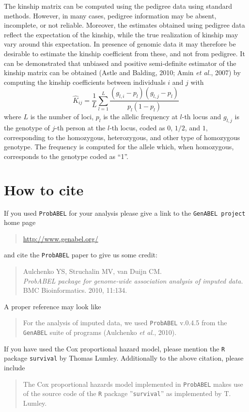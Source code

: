 \documentclass[12pt,a4paper]{article}
\newcommand{\PA}{\texttt{ProbABEL}}
\begin{document}
The kinship matrix can be computed using the pedigree data using standard methods.
However, in many cases, pedigree information may be absent, incomplete, or not
reliable. Moreover, the estimates obtained using pedigree data reflect the
expectation of the kinship, while the true realization of kinship may vary
around this expectation. In presence of genomic data it may therefore be
desirable to estimate the kinship coefficient from these, and not from pedigree.
It can be demonstrated that unbiased and positive semi-definite estimator
of the kinship matrix can be obtained (Astle and Balding, 2010; Amin \emph{et al.}, 2007)
by computing the kinship coefficients between individuals $i$ and $j$ with
$$
\hat{K}_{ij} = \frac{1}{L} \sum_{l=1}^L \frac{ (g_{l,i} - p_l) (g_{l,j} - p_l) }{ p_l (1-p_l) }
$$
where $L$ is the number of loci, $p_l$ is the allelic frequency at $l$-th locus
and $g_{l,j}$ is the genotype of $j$-th person at the $l$-th locus, coded
as $0$, $1/2$, and $1$, corresponding to the homozygous, heterozygous, and
other type of homozygous genotype. The frequency is computed for the allele
which, when homozygous, corresponds to the genotype coded as ``1''.


\section{How to cite}

If you used \PA{} for your analysis please give a link to the
\texttt{GenABEL project} home page
\begin{quote}
\url{http://www.genabel.org/}
\end{quote}
and cite the \PA{} paper to give us some credit:
\begin{quote}
Aulchenko YS, Struchalin MV, van Duijn CM.\\
\emph{ProbABEL package for genome-wide association analysis of imputed data.}\\
BMC Bioinformatics. 2010, 11:134.
\end{quote}
A proper reference may look like
\begin{quote}
For the analysis of imputed data, we used \PA{} v.0.4.5
from the \texttt{GenABEL} suite of programs (Aulchenko \emph{et al.}, 2010).
\end{quote}

If you have used the Cox proportional hazard model, please mention the
\texttt{R} package \texttt{survival} by Thomas Lumley. Additionally
to the above citation, please include
\begin{quote}
The Cox proportional hazards model implemented in \PA{}
makes use of the source code of the \texttt{R} package ''\texttt{survival}''
as implemented by T. Lumley.
\end{quote}
\end{document}
